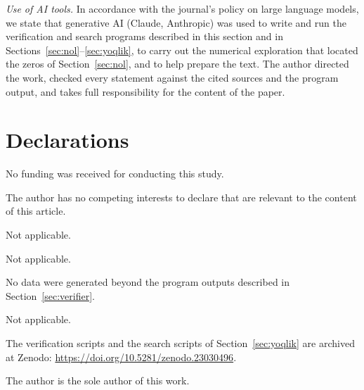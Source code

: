 \documentclass[pdflatex,sn-mathphys-num]{sn-jnl}
\theoremstyle{thmstyleone}%
\theoremstyle{thmstyletwo}%
\begin{document}
\emph{Use of AI tools.} In accordance with the journal's policy on large language models, we state that generative AI (Claude, Anthropic) was used to write and run the verification and search programs described in this section and in Sections~\ref{sec:nol}--\ref{sec:yoqlik}, to carry out the numerical exploration that located the zeros of Section~\ref{sec:nol}, and to help prepare the text. The author directed the work, checked every statement against the cited sources and the program output, and takes full responsibility for the content of the paper.


\backmatter

\section*{Declarations}

 No funding was received for conducting this study.

 The author has no competing interests to declare that are relevant to the content of this article.

 Not applicable.

 Not applicable.

 No data were generated beyond the program outputs described in Section~\ref{sec:verifier}.

 Not applicable.

 The verification scripts and the search scripts of Section~\ref{sec:yoqlik} are archived at Zenodo: \url{https://doi.org/10.5281/zenodo.23030496}.

 The author is the sole author of this work.
\end{document}
